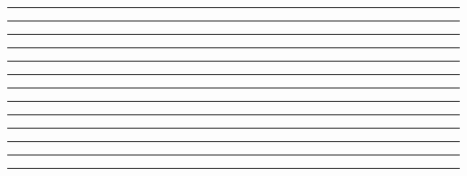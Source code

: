 \documentclass{article}
\begin{document}
\newpage
\noindent{}\rule{1cm}{0.025cm}\framebox{\rule{1cm}{1cm}}

\newpage
\noindent{}\rule{1cm}{0.025cm}

\newpage
\noindent{}\rule{1cm}{0.025cm}

\newpage
\noindent{}\rule{1cm}{0.025cm}

\newpage
\noindent{}\rule{1cm}{0.025cm}

\newpage
\noindent{}\rule{1cm}{0.025cm}

\newpage
\noindent{}\rule{1cm}{0.025cm}

\newpage
\noindent{}\rule{1cm}{0.025cm}

\newpage
\noindent{}\rule{1cm}{0.025cm}

\newpage
\noindent{}\rule{1cm}{0.025cm}

\newpage
\noindent{}\rule{1cm}{0.025cm}

\newpage
\noindent{}\rule{1cm}{0.025cm}

\newpage
\noindent{}\rule{1cm}{0.025cm}
\end{document}
